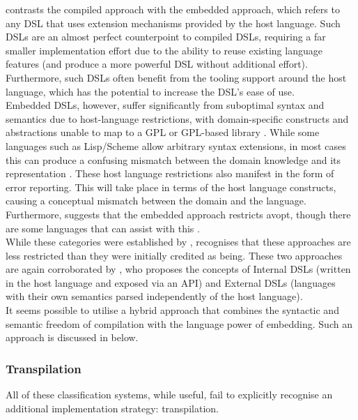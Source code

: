 \citet{Mernik:2005:DDL:1118890.1118892} contrasts the compiled approach with the embedded approach, which refers to any DSL that uses extension mechanisms provided by the host language. 
Such DSLs are an almost perfect counterpoint to compiled DSLs, requiring a far smaller implementation effort due to the ability to reuse existing language features (and produce a more powerful DSL without additional effort). 
Furthermore, such DSLs often benefit from the tooling support around the host language, which has the potential to increase the DSL's ease of use. \\

Embedded DSLs, however, suffer significantly from suboptimal syntax and semantics due to host-language restrictions, with domain-specific constructs and abstractions unable to map to a GPL or GPL-based library \citep{Mernik:2005:DDL:1118890.1118892,van2000domain}. 
While some languages such as Lisp/Scheme allow arbitrary syntax extensions, in most cases this can produce a confusing mismatch between the domain knowledge and its representation \citep{jennings1999verischemelog}. 
These host language restrictions also manifest in the form of error reporting. 
This will take place in terms of the host language constructs, causing a conceptual mismatch between the domain and the language. 
Furthermore, \citet{Mernik:2005:DDL:1118890.1118892} suggests that the embedded approach restricts \gls{avopt}, though there are some languages that can assist with this \citep{seefried2004optimising}.\\

While these categories were established by \citet{van2000domain}, \citet{Mernik:2005:DDL:1118890.1118892} recognises that these approaches are less restricted than they were initially credited as being. 
These two approaches are again corroborated by \citet{fowler2010domain}, who proposes the concepts of Internal DSLs (written in the host language and exposed via an API) and External DSLs (languages with their own semantics parsed independently of the host language). \\

It seems possible to utilise a hybrid approach that combines the syntactic and semantic freedom of compilation with the language power of embedding. 
Such an approach is discussed in  below. 


\subsubsection{Transpilation} %
\label{ssub:transpilation}
All of these classification systems, while useful, fail to explicitly recognise an additional implementation strategy: transpilation. \\

